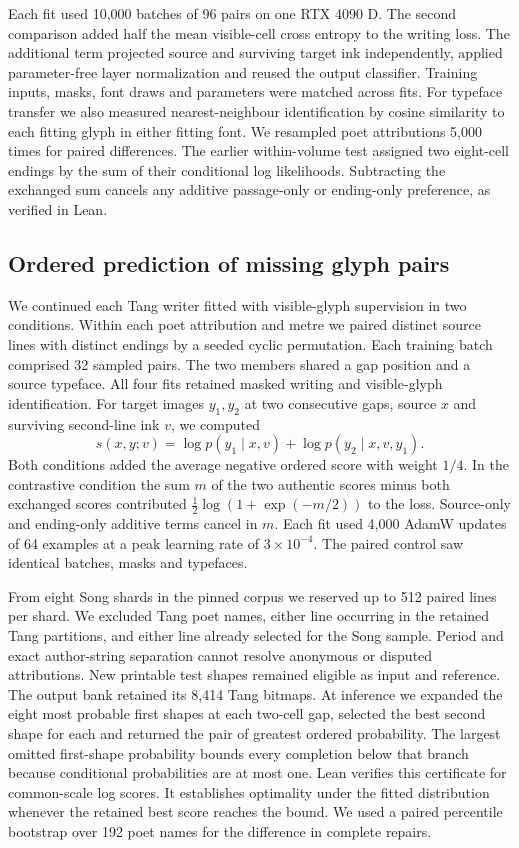\documentclass[12pt,a4paper]{article}
\providecommand{\DIFadd}[1]{{\protect\color{blue} \sf #1}} %
\begin{document}
\DIFadd{Each fit used 10,000 batches of 96 pairs on one RTX 4090 D. The second comparison added half the mean visible-cell cross entropy to the writing loss. The additional term projected source and surviving target ink independently, applied parameter-free layer normalization and reused the output classifier. Training inputs, masks, font draws and parameters were matched across fits. For typeface transfer we also measured nearest-neighbour identification by cosine similarity to each fitting glyph in either fitting font. We resampled poet attributions 5,000 times for paired differences. The earlier within-volume test assigned two eight-cell endings by the sum of their conditional log likelihoods. Subtracting the exchanged sum cancels any additive passage-only or ending-only preference, as verified in Lean.
}


\subsection*{\DIFadd{Ordered prediction of missing glyph pairs}}
\DIFadd{We continued each Tang writer fitted with visible-glyph supervision in two conditions. Within each poet attribution and metre we paired distinct source lines with distinct endings by a seeded cyclic permutation. Each training batch comprised 32 sampled pairs. The two members shared a gap position and a source typeface. All four fits retained masked writing and visible-glyph identification. For target images $y_1,y_2$ at two consecutive gaps, source $x$ and surviving second-line ink $v$, we computed
}\[
 s(x,y;v)=\log p(y_1\mid x,v)+\log p(y_2\mid x,v,y_1).
\]
\DIFadd{Both conditions added the average negative ordered score with weight $1/4$. In the contrastive condition the sum $m$ of the two authentic scores minus both exchanged scores contributed $\frac{1}{2}\log(1+\exp(-m/2))$ to the loss. Source-only and ending-only additive terms cancel in $m$. Each fit used 4,000 AdamW updates of 64 examples at a peak learning rate of $3\times10^{-4}$. The paired control saw identical batches, masks and typefaces.
}

\DIFadd{From eight Song shards in the pinned corpus we reserved up to 512 paired lines per shard. We excluded Tang poet names, either line occurring in the retained Tang partitions, and either line already selected for the Song sample. Period and exact author-string separation cannot resolve anonymous or disputed attributions. New printable test shapes remained eligible as input and reference. The output bank retained its 8,414 Tang bitmaps. At inference we expanded the eight most probable first shapes at each two-cell gap, selected the best second shape for each and returned the pair of greatest ordered probability. The largest omitted first-shape probability bounds every completion below that branch because conditional probabilities are at most one. Lean verifies this certificate for common-scale log scores. It establishes optimality under the fitted distribution whenever the retained best score reaches the bound. We used a paired percentile bootstrap over 192 poet names for the difference in complete repairs.
}
\end{document}
